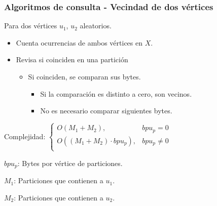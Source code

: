 \begin{frame}
\frametitle{Algoritmos de consulta - Vecindad de dos vértices}

Para dos vértices $u_{1}$, $u_{2}$ aleatorios.
\begin{itemize}
	\item Cuenta ocurrencias de ambos vértices en $X$.
	\item Revisa si coinciden en una partición
	\begin{itemize}
		\footnotesize
		\item Si coinciden, se comparan sus bytes.
		\begin{itemize}
			\footnotesize
			\item Si la comparación es distinto a cero, son vecinos.
			\item No es necesario comparar siguientes bytes.
		\end{itemize}
	\end{itemize}
\end{itemize}

\vspace{6mm}
Complejidad: 
$\begin{cases}
	O(M_{1} + M_{2}), & bpu_{p} = 0 \\
	O((M_{1} + M_{2}) \cdot bpu_{p}), & bpu_{p} \neq 0  \\
\end{cases}$

\vspace{3mm}
{\footnotesize
$bpu_{p}$: Bytes por vértice de particiones.

$M_{1}$: Particiones que contienen a $u_{1}$.

$M_{2}$: Particiones que contienen a $u_{2}$.
}

\end{frame}



